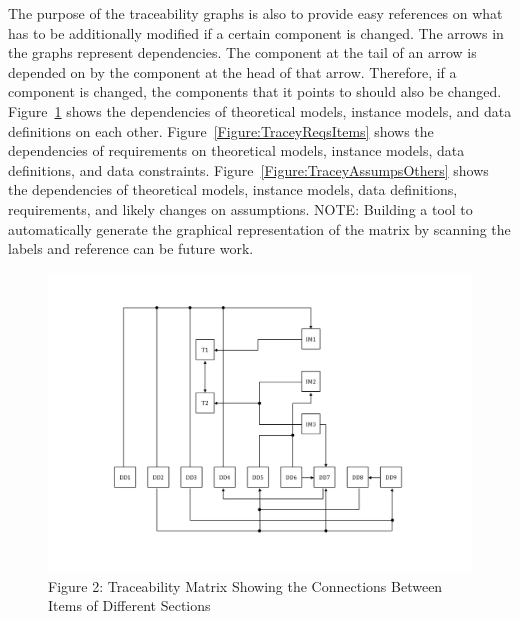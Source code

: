 \documentclass[12pt]{article}
\begin{document}
The purpose of the traceability graphs is also to provide easy references on what has to be additionally modified if a certain component is changed. The arrows in the graphs represent dependencies. The component at the tail of an arrow is depended on by the component at the head of that arrow. Therefore, if a component is changed, the components that it points to should also be changed. Figure~\ref{Figure:TraceyItemSecs} shows the dependencies of theoretical models, instance models, and data definitions on each other. Figure~\ref{Figure:TraceyReqsItems} shows the dependencies of requirements on theoretical models, instance models, data definitions, and data constraints. Figure~\ref{Figure:TraceyAssumpsOthers} shows the dependencies of theoretical models, instance models, data definitions, requirements, and likely changes on assumptions.
NOTE: Building a tool to automatically generate the graphical representation of the matrix by scanning the labels and reference can be future work.
\begin{figure}
\begin{center}
\includegraphics[width=\textwidth]{../../../datafiles/GlassBR/Trace.png}
\caption{Figure 2: Traceability Matrix Showing the Connections Between Items of Different Sections}
\label{Figure:TraceyItemSecs}
\end{center}
\end{figure}
\end{document}
